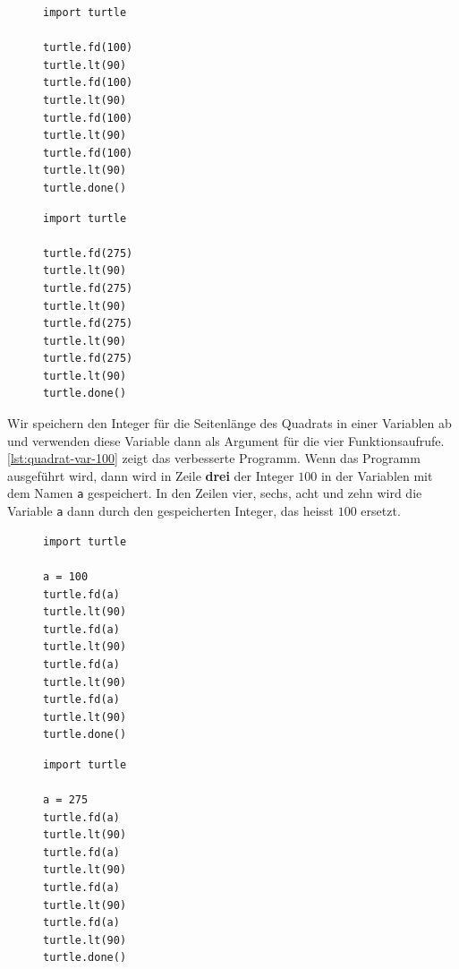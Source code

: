\begin{figure}[htb]
    \centering
    \begin{minipage}{0.4\linewidth}
        \centering
        \begin{lstlisting}[language={python3}, caption={Quadrat (Länge $100$).}, label={lst:quadrat-100}]
import turtle

turtle.fd(100)
turtle.lt(90)
turtle.fd(100)
turtle.lt(90)
turtle.fd(100)
turtle.lt(90)
turtle.fd(100)
turtle.lt(90)
turtle.done()

\end{lstlisting}
\end{minipage}
\hfill
\begin{minipage}{0.4\linewidth}
\centering
\begin{lstlisting}[language={python3}, caption={Quadrat (Länge $275$).}, label={lst:quadrat-275}]
import turtle

turtle.fd(275)
turtle.lt(90)
turtle.fd(275)
turtle.lt(90)
turtle.fd(275)
turtle.lt(90)
turtle.fd(275)
turtle.lt(90)
turtle.done()

\end{lstlisting}
\end{minipage}
\end{figure}

Wir speichern den Integer für die Seitenlänge des Quadrats in einer Variablen ab und verwenden diese Variable dann als Argument für die vier Funktionsaufrufe. \autoref{lst:quadrat-var-100} zeigt das verbesserte Programm. Wenn das Programm ausgeführt wird, dann wird in Zeile \textbf{drei} der Integer $100$ in der Variablen mit dem Namen \lstinline[language={python3}]{a} gespeichert. In den Zeilen vier, sechs, acht und zehn wird die Variable \lstinline[language={python3}]{a} dann durch den gespeicherten Integer, das heisst $100$ ersetzt.

\begin{figure}[htb]
\centering
\begin{minipage}{0.4\linewidth}
\centering
\begin{lstlisting}[language={python3}, caption={Die Variable \texttt{a} speichert den Integer $100$ (\graybgtexttt{quadrat\_var.py}).}, label={lst:quadrat-var-100}]
import turtle

a = 100
turtle.fd(a)
turtle.lt(90)
turtle.fd(a)
turtle.lt(90)
turtle.fd(a)
turtle.lt(90)
turtle.fd(a)
turtle.lt(90)
turtle.done()

\end{lstlisting}
\end{minipage}
\hfill
\begin{minipage}{0.4\linewidth}
\centering
\begin{lstlisting}[language={python3}, caption={Zeile drei wurde angepasst - nun wird der Integer $275$ gespeichert.}, label={lst:quadrat-var-275}]
import turtle

a = 275
turtle.fd(a)
turtle.lt(90)
turtle.fd(a)
turtle.lt(90)
turtle.fd(a)
turtle.lt(90)
turtle.fd(a)
turtle.lt(90)
turtle.done()

\end{lstlisting}
\end{minipage}
\end{figure}

